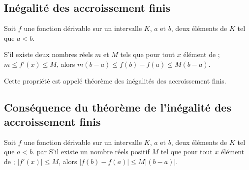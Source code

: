 \subsection{Inégalité des accroissement finis}
\begin{propriete}
Soit $f$ une fonction dérivable sur un intervalle $K$, $a$ et $b$, deux éléments de $K$ tel que $a<b$.
\par S'il existe deux nombres réels $m$ et $M$ tels que pour tout $x$ élément de  ; $m\leq f'(x)\leq M$, alors $m(b-a)\leq f(b)-f(a)\leq M(b-a)$.
\par Cette propriété est appelé théorème des inégalités des accroissement finis.
\end{propriete}
\subsection{Conséquence du théorème de l'inégalité des accroissement finis}
\begin{propriete}
	Soit $f$ une fonction dérivable sur un intervalle $K$, $a$ et $b$, deux éléments de $K$ tel que $a<b$.
	par S'il existe un nombre réels positif $M$ tel que pour tout $x$ élément de  ; $\lvert f'(x)\rvert\leq M$, alors $\lvert f(b)-f(a)\rvert\leq M\lvert(b-a)\rvert$.
\end{propriete}
